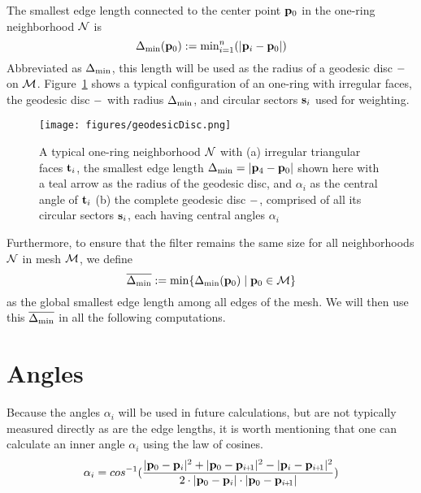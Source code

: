 The smallest edge length connected to the center point $\mathbf{p}_0$ in the one-ring neighborhood $\mathcal{N}$ is
\begin{equation}
	\Delta_\text{min}(\mathbf{p}_0) := \text{min}^n_{i=1} (|\mathbf{p}_i - \mathbf{p}_0|)
	\label{eq:localMinimumEdgeLength}
\end{equation}
Abbreviated as $\Delta_\text{min}$, this length will be used as the radius of a geodesic disc $\mathcal{\Gamma}$ on $\mathcal{M}$. %
%
%
Figure~\ref{fig:geodesicDisc} shows a typical configuration of an one-ring with irregular faces, the geodesic disc $\mathcal{\Gamma}$ with radius $\Delta_\text{min}$, and circular sectors $\mathbf{s}_i$ used for weighting.
\begin{figure}[ht]
\ffigbox
	{\texttt{[image: figures/geodesicDisc.png]}}
	{\caption[One-ring and geodesic disc]{A typical one-ring neighborhood $\mathcal{N}$ with (a) irregular triangular faces $\mathbf{t}_i$, the smallest edge length $\Delta_\text{min} = |\mathbf{p}_4 - \mathbf{p}_0|$ shown here with a teal arrow as the radius of the geodesic disc, and $\alpha_i$ as the central angle of $\mathbf{t}_i$ (b) the complete geodesic disc $\mathcal{\Gamma}$, comprised of all its circular sectors $\mathbf{s}_i$, each having central angles $\alpha_i$}\label{fig:geodesicDisc}}
\end{figure}%
%
%

Furthermore, to ensure that the filter remains the same size for all neighborhoods $\mathcal{N}$ in mesh $\mathcal{M}$, we define
\begin{equation}
	\overline{\Delta_\text{min}} := \min\{\Delta_\text{min}(\mathbf{p}_0) \;|\; \mathbf{p}_0 \in \mathcal{M}\}
	\label{eq:globalMinimumEdgeLength}
\end{equation}%
%
as the global smallest edge length among all edges of the mesh. We will then use this $\overline{\Delta_\text{min}}$ in all the following computations.
%
\section{Angles}
\label{cFONSsA}
Because the angles $\alpha_i$ will be used in future calculations, but are not typically measured directly as are the edge lengths, it is worth mentioning that one can calculate an inner angle $\alpha_i$ using the law of cosines. 
\begin{equation}
	\alpha_i = cos^{-1}(\frac{|\bp_0 - \bp_{i}|^2 + |\bp_0 - \bp_{\sipo}|^2 - |\bp_i - \bp_{\sipo}|^2}{2\cdot|\bp_0 - \bp_{i}|\cdot|\bp_0 - \bp_{\sipo}|})
	\label{eq:alphaFromEdgeLengths}
\end{equation}%
%

